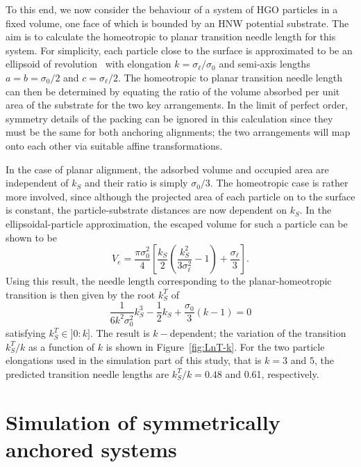 \documentclass[aps,10pt,twocolumn]{revtex4}
\newcommand{\lp}{\left(}
\newcommand{\rp}{\right)}
\newcommand{\so}{\sigma_0}
\newcommand{\sel}{\sigma_\ell}
\begin{document}
To this end, we now consider the behaviour of a system of HGO particles in a fixed volume, one face of which is
bounded by an HNW potential substrate. The aim is to calculate the homeotropic to planar transition needle length
for this system. For simplicity, each particle close to the surface is approximated to be an ellipsoid of
revolution~\cite{Rigby89} with elongation $k=\sel/\so$ and semi-axis lengths $a=b=\so/2$ and $c=\sel/2$. The
homeotropic to planar transition needle length can then be determined by equating the ratio of the volume absorbed
per unit area of the substrate for the two key arrangements. In the limit of perfect order, symmetry details of
the packing can be ignored in this calculation since they must be the same for both anchoring alignments; the two
arrangements will map onto each other via suitable affine transformations.

In the case of planar alignment, the adsorbed volume and occupied area are independent of $k_S$ and their ratio is
simply $\so/3$. The homeotropic case is rather more involved, since although the projected area of each particle
on to the surface is constant, the particle-substrate distances are now dependent on $k_S$. In the
ellipsoidal-particle approximation, the escaped volume for such a particle can be shown to be
\begin{equation}
    V_e = \frac{\pi\so^2}{4}
    \left[
    \frac{k_S}{2} \lp \frac{k_S^2}{3\sel^2} -1  \rp + \frac{\sel}{3}
    \right]
    \label{eqn:V_H(Ln)}.
\end{equation}
Using this result, the needle length corresponding to the planar-homeotropic transition is then given by the root
$k_S^T$ of
\begin{equation}
        \frac{1}{6k^2\so^2}k_S^3 - \frac{1}{2}k_S + \frac{\so}{3}\lp k-1\rp = 0
        \label{eqn:LnTfinalPoly}
\end{equation}
satisfying $k_S^T \in ]0:k]$. The result is $k-$dependent; the variation of the transition $k_S^T/k$ as a function
of $k$ is shown in Figure~\ref{fig:LnT-k}. For the two particle elongations used in the simulation part of this
study, that is $k=3$ and $5$, the predicted transition needle lengths are $k_S^T/k = 0.48$ and 0.61, respectively.

\section{Simulation of symmetrically anchored systems}
\label{s:simRes}
\end{document}
